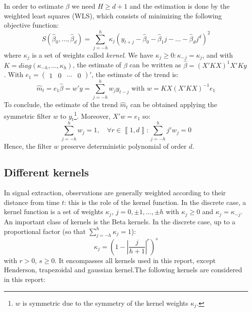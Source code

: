 \documentclass[
  12pt,
  ,
  a4paper]{article}
\newcommand\1{\mathds{1}}
\begin{document}
In order to estimate \(\beta\) we need \(H\geq d+1\) and the estimation is done by the weighted least squares (WLS), which consists of minimizing the following objective function:
\[
S(\hat{\beta}_{0},\dots,\hat{\beta}_{d})=\sum_{j=-h}^{h}\kappa_{j}(y_{t+j}-\hat{\beta}_{0}-\hat{\beta}_{1}j-\dots-\hat{\beta}_{d}j^{d})^{2}
\]
where \(\kappa_j\) is a set of weights called \emph{kernel}. We have \(\kappa_j\geq 0:\kappa_{-j}=\kappa_j\), and with \(K=diag(\kappa_{-h},\dots,\kappa_{h})\), the estimate of \(\beta\) can be written as \(\hat{\beta}=(X'KX)^{1}X'Ky\).
With \(e_{1}=\begin{pmatrix}1&0&\cdots&0\end{pmatrix}'\), the estimate of the trend is:
\[
\hat{m}_{t}=e_{1}\hat{\beta}=w'y=\sum_{j=-h}^{h}w_{j}y_{t-j}\text{ with }w=KX(X'KX)^{-1}e_{1}
\]
To conclude, the estimate of the trend \(\hat{m}_{t}\) can be obtained applying the symmetric filter \(w\) to \(y_t\)\footnote{
  \(w\) is symmetric due to the symmetry of the kernel weights \(\kappa_j\).}.
Moreover, \(X'w=e_{1}\) so:
\[
\sum_{j=-h}^{h}w_{j}=1,\quad\forall r\in\left\llbracket 1,d\right\rrbracket :\sum_{j=-h}^{h}j^{r}w_{j}=0
\]
Hence, the filter \(w\) preserve deterministic polynomial of order \(d\).

\hypertarget{sec:kernels}{%
\subsection{Different kernels}\label{sec:kernels}}

In signal extraction, observations are generally weighted according to their distance from time \(t\): this is the role of the kernel function.
In the discrete case, a kernel function is a set of weights \(\kappa_j\), \(j=0,\pm1,\dots,\pm h\) with \(\kappa_j \geq0\) and \(\kappa_j=\kappa_{-j}\).
An important class of kernels is the Beta kernels. In the discrete case, up to a proportional factor (so that \(\sum_{j=-h}^h\kappa_j=1\)):
\[
\kappa_j = \left(
  1-
  \left\lvert
  \frac j {h+1}
  \right\lvert^r
\right)^s
\]
with \(r>0\), \(s\geq 0\).
It encompasses all kernels used in this report, except Henderson, trapezoidal and gaussian kernel.The following kernels are considered in this report:
\end{document}
